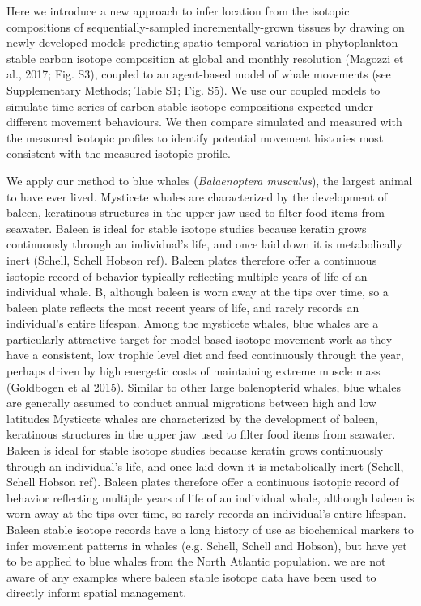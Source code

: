 \documentclass[a4paper,12pt]{article}
\begin{document}
Here we introduce a new approach to infer location from the isotopic compositions of sequentially-sampled incrementally-grown tissues by drawing on newly developed models predicting spatio-temporal variation in phytoplankton stable carbon isotope composition at global and monthly resolution (Magozzi et al., 2017; Fig. S3), coupled to an agent-based model of whale movements (see Supplementary Methods; Table S1; Fig. S5).
We use our coupled models to simulate time series of carbon stable isotope compositions expected under different movement behaviours.
We then compare simulated and measured with the measured isotopic profiles to identify potential movement histories most consistent with the measured isotopic profile. 

We apply our method to blue whales (\textit{Balaenoptera musculus}), the largest animal to have ever lived. 
Mysticete whales are characterized by the development of baleen, keratinous structures in the upper jaw used to filter food items from seawater. 
Baleen is ideal for stable isotope studies because keratin grows continuously through an individual’s life, and once laid down it is metabolically inert (Schell, Schell Hobson ref). 
Baleen plates therefore offer a continuous isotopic record of behavior typically reflecting multiple years of life of an individual whale. 
B, although baleen is worn away at the tips over time, so a baleen plate reflects the most recent years of life, and rarely records an individual’s entire lifespan. 
Among the mysticete whales, blue whales are a particularly attractive target for model-based isotope movement work as they have a consistent, low trophic level diet and feed continuously through the year, perhaps driven by high energetic costs of maintaining extreme muscle mass (Goldbogen et al 2015).
Similar to other large balenopterid whales, blue whales are generally assumed to conduct annual migrations between high and low latitudes
Mysticete whales are characterized by the development of baleen, keratinous structures in the upper jaw used to filter food items from seawater. Baleen is ideal for stable isotope studies because keratin grows continuously through an individual’s life, and once laid down it is metabolically inert (Schell, Schell Hobson ref). Baleen plates therefore offer a continuous isotopic record of behavior reflecting multiple years of life of an individual whale, although baleen is worn away at the tips over time, so rarely records an individual’s entire lifespan. Baleen stable isotope records have a long history of use as biochemical markers to infer movement patterns in whales (e.g. Schell, Schell and Hobson), but have yet to be applied to blue whales from the North Atlantic population. we are not aware of any examples where baleen stable isotope data have been used to directly inform spatial management.  
\end{document}
